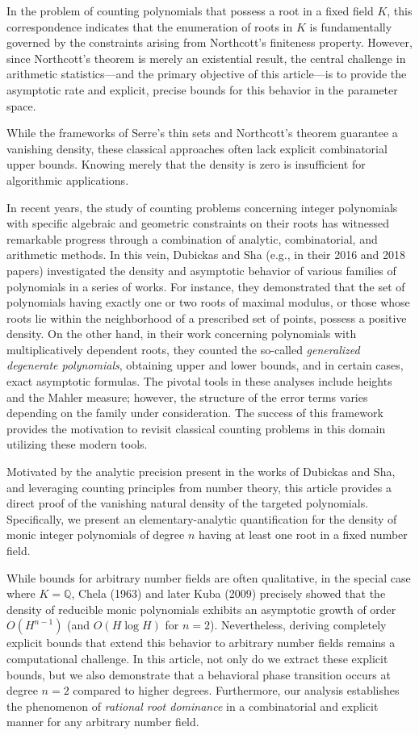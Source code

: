 \documentclass[11pt,a4paper]{article}
\newcommand{\Q}{\mathbb{Q}}
\begin{document}
In the problem of counting polynomials that possess a root in a fixed field $K$, this correspondence indicates that the enumeration of roots in $K$ is fundamentally governed by the constraints arising from Northcott's finiteness property. However, since Northcott's theorem is merely an existential result, the central challenge in arithmetic statistics---and the primary objective of this article---is to provide the asymptotic rate and explicit, precise bounds for this behavior in the parameter space.

While the frameworks of Serre's thin sets and Northcott's theorem guarantee a vanishing density, these classical approaches often lack explicit combinatorial upper bounds. Knowing merely that the density is zero is insufficient for algorithmic applications.

In recent years, the study of counting problems concerning integer polynomials with specific algebraic and geometric constraints on their roots has witnessed remarkable progress through a combination of analytic, combinatorial, and arithmetic methods. In this vein, Dubickas and Sha (e.g., in their 2016 and 2018 papers) investigated the density and asymptotic behavior of various families of polynomials in a series of works. For instance, they demonstrated that the set of polynomials having exactly one or two roots of maximal modulus, or those whose roots lie within the neighborhood of a prescribed set of points, possess a positive density. On the other hand, in their work concerning polynomials with multiplicatively dependent roots, they counted the so-called \textit{generalized degenerate polynomials}, obtaining upper and lower bounds, and in certain cases, exact asymptotic formulas. The pivotal tools in these analyses include heights and the Mahler measure; however, the structure of the error terms varies depending on the family under consideration. The success of this framework provides the motivation to revisit classical counting problems in this domain utilizing these modern tools.

Motivated by the analytic precision present in the works of Dubickas and Sha, and leveraging counting principles from number theory, this article provides a direct proof of the vanishing natural density of the targeted polynomials. Specifically, we present an elementary-analytic quantification for the density of monic integer polynomials of degree $n$ having at least one root in a fixed number field.

While bounds for arbitrary number fields are often qualitative, in the special case where $K = \Q$, Chela (1963) and later Kuba (2009) precisely showed that the density of reducible monic polynomials exhibits an asymptotic growth of order $O(H^{n-1})$ (and $O(H\log H)$ for $n=2$). Nevertheless, deriving completely explicit bounds that extend this behavior to arbitrary number fields remains a computational challenge. In this article, not only do we extract these explicit bounds, but we also demonstrate that a behavioral phase transition occurs at degree $n=2$ compared to higher degrees. Furthermore, our analysis establishes the phenomenon of \textit{rational root dominance} in a combinatorial and explicit manner for any arbitrary number field.
\end{document}
